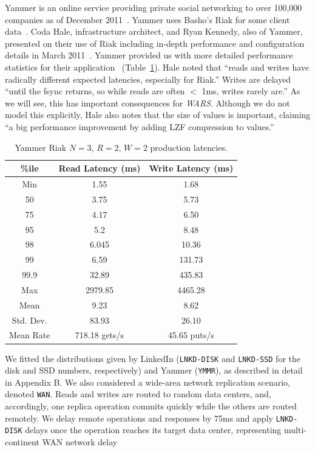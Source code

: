 \documentclass{vldb}
\begin{document}
Yammer is an online service providing private social networking to
over 100,000 companies as of December 2011~\cite{yammer}.  Yammer uses
Basho's Riak for some client data~\cite{riak}.  Coda Hale,
infrastructure architect, and Ryan Kennedy, also of Yammer, presented
on their use of Riak including in-depth performance and configuration
details in March 2011~\cite{riakyammer}.  Yammer provided us with more
detailed performance statistics for their application~\cite{codapc}
(Table~\ref{table:yammer}).  Hale noted that ``reads and writes have
radically different expected latencies, especially for Riak.''  Writes
are delayed ``until the fsync returns, so while reads are often $<$
1ms, writes rarely are.''  As we will see, this has important
consequences for \textit{WARS}.  Although we do not model this
explicitly, Hale also notes that the size of values is important,
claiming ``a big performance improvement by adding LZF compression to
values.''

\begin{table}
\centering
\begin{tabular}{|c|c|c|}
\hline
\%ile & Read Latency (ms) & Write Latency (ms)\\
\hline
Min & 1.55 & 1.68\\
50 & 3.75 & 5.73 \\
75 & 4.17 & 6.50\\
95 & 5.2 & 8.48\\
98 & 6.045 & 10.36 \\
99 & 6.59 & 131.73\\
99.9 & 32.89 & 435.83\\
Max & 2979.85 &  4465.28 \\
\hline
Mean & 9.23 & 8.62 \\
Std. Dev. & 83.93 & 26.10\\
\hline
Mean Rate & 718.18 gets/s & 45.65 puts/s\\
\hline
\end{tabular}
\vspace{-4pt}
\caption{Yammer Riak $N$$=$$3$, $R$$=$$2$, $W$$=$$2$ production latencies.}
\vspace{-6pt}
\label{table:yammer}
\end{table}

We fitted the distributions given by LinkedIn (\texttt{LNKD-DISK} and
\texttt{LNKD-SSD} for the disk and SSD numbers, respectively) and
Yammer (\texttt{YMMR}), as described in detail in Appendix B. We also
considered a wide-area network replication scenario, denoted
\texttt{WAN}.  Reads and writes are routed to random data centers,
and, accordingly, one replica operation commits quickly while the
others are routed remotely.  We delay remote operations and responses
by 75ms and apply \texttt{LNKD-DISK} delays once the operation reaches
its target data center, representing multi-continent WAN network
delay~\cite{dean-keynote}
\end{document}
